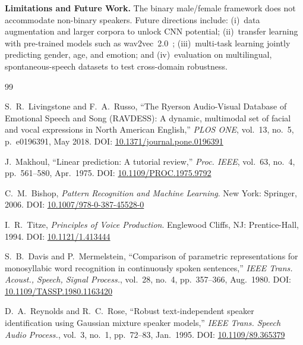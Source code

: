 \documentclass[conference]{IEEEtran}
\begin{document}
\textbf{Limitations and Future Work.}
The binary male/female framework does not accommodate non-binary speakers.
Future directions include: (i)~data augmentation and larger corpora to
unlock CNN potential; (ii)~transfer learning with pre-trained models such
as wav2vec~2.0~\cite{baevski2020wav2vec}; (iii)~multi-task learning
jointly predicting gender, age, and emotion; and (iv)~evaluation on
multilingual, spontaneous-speech datasets to test cross-domain robustness.

\begin{thebibliography}{99}

S.~R.~Livingstone and F.~A.~Russo,
``The Ryerson Audio-Visual Database of Emotional Speech and Song (RAVDESS):
A dynamic, multimodal set of facial and vocal expressions in North American
English,''
\emph{PLOS ONE}, vol.~13, no.~5, p.~e0196391, May 2018.
\newblock DOI: \href{https://doi.org/10.1371/journal.pone.0196391}{10.1371/journal.pone.0196391}

J.~Makhoul,
``Linear prediction: A tutorial review,''
\emph{Proc. IEEE}, vol.~63, no.~4, pp.~561--580, Apr.~1975.
\newblock DOI: \href{https://doi.org/10.1109/PROC.1975.9792}{10.1109/PROC.1975.9792}

C.~M.~Bishop,
\emph{Pattern Recognition and Machine Learning}.
New York: Springer, 2006.
\newblock DOI: \href{https://doi.org/10.1007/978-0-387-45528-0}{10.1007/978-0-387-45528-0}

I.~R.~Titze,
\emph{Principles of Voice Production}.
Englewood Cliffs, NJ: Prentice-Hall, 1994.
\newblock DOI: \href{https://doi.org/10.1121/1.413444}{10.1121/1.413444}

S.~B.~Davis and P.~Mermelstein,
``Comparison of parametric representations for monosyllabic word recognition
in continuously spoken sentences,''
\emph{IEEE Trans. Acoust., Speech, Signal Process.},
vol.~28, no.~4, pp.~357--366, Aug.~1980.
\newblock DOI: \href{https://doi.org/10.1109/TASSP.1980.1163420}{10.1109/TASSP.1980.1163420}

D.~A.~Reynolds and R.~C.~Rose,
``Robust text-independent speaker identification using Gaussian mixture
speaker models,''
\emph{IEEE Trans. Speech Audio Process.}, vol.~3, no.~1, pp.~72--83,
Jan.~1995.
\newblock DOI: \href{https://doi.org/10.1109/89.365379}{10.1109/89.365379}


\end{thebibliography}
\end{document}
